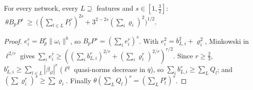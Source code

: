 \documentclass[11pt]{article}
\theoremstyle{remark}\newtheorem{remark}[theorem]{Remark}
\begin{document}
\begin{lemma}\label{l:ledger}
For every network, every $L\supseteq$ features and $s\in[1,\frac32]$:
$\ \theta B_pP^s\ \ge\ \big((\textstyle\sum_{l\in L}P_l^{\,r})^{2s}+3^{2-2s}(\sum_i\varrho_i)^2\big)^{1/2}$.
\end{lemma}
\begin{proof}
$e_i^r=B_p^r\|\omega_i\|^b$, so $B_pP^s=(\sum_ie_i^r)^s$.  With $e_i^2=b_{L,i}^2+\varrho_i^2$, Minkowski in $\ell^{2/r}$ gives
$\sum_ie_i^r\ge((\sum_ib_{L,i}^r)^{2/r}+(\sum_i\varrho_i^r)^{2/r})^{r/2}$.  Since $r\ge\frac23$, $b_{L,i}^r\ge\sum_{l\in L}|\beta_{il}|^r$
($\ell^q$ quasi-norms decrease in $q$), so $\sum_ib_{L,i}^r\ge\sum_LQ_l$; and $(\sum\varrho_i^r)^s\ge\sum\varrho_i$.  Finally
$\theta(\sum_LQ_l)^s=(\sum_LP_l^r)^s$.
\end{proof}
\end{document}
